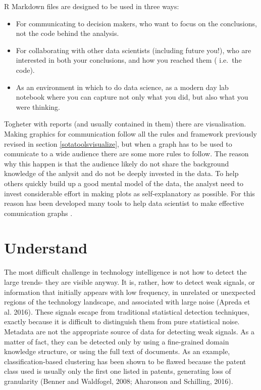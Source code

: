 \documentclass[]{book}
\begin{document}
R Markdown files are designed to be used in three ways:

\begin{itemize}
\item
  For communicating to decision makers, who want to focus on the
  conclusions, not the code behind the analysis.
\item
  For collaborating with other data scientists (including future you!),
  who are interested in both your conclusions, and how you reached them
  ( i.e.~the code).
\item
  As an environment in which to do data science, as a modern day lab
  notebook where you can capture not only what you did, but also what
  you were thinking.
\end{itemize}

Togheter with reports (and usually contained in them) there are
visualisation. Making graphics for communication follow all the rules
and framework previously revised in section \ref{sotatoolsvisualize},
but when a graph has to be used to comunicate to a wide audience there
are some more rules to follow. The reason why this happen is that the
audience likely do not share the background knowledge of the anlysit and
do not be deeply invested in the data. To help others quickly build up a
good mental model of the data, the analyst need to invest considerable
effort in making plots as self-explanatory as possible. For this reason
has been developed many tools to help data scientist to make effective
comunication
graphs\citep{wickham2016ggplot2, shiny2017, plotly2017, ggprah2018, ICWSM09154}
.

\section{Understand}\label{sotadocumentsunderstand}

The most difficult challenge in technology intelligence is not how to
detect the large trends- they are visible anyway. It is, rather, how to
detect weak signals, or information that initially appears with low
frequency, in unrelated or unexpected regions of the technology
landscape, and associated with large noise (Apreda et al. 2016). These
signals escape from traditional statistical detection techniques,
exactly because it is difficult to distinguish them from pure
statistical noise. Metadata are not the appropriate source of data for
detecting weak signals. As a matter of fact, they can be detected only
by using a fine-grained domain knowledge structure, or using the full
text of documents. As an example, classification-based clustering has
been shown to be flawed because the patent class used is usually only
the first one listed in patents, generating loss of granularity (Benner
and Waldfogel, 2008; Aharonson and Schilling, 2016).
\end{document}
